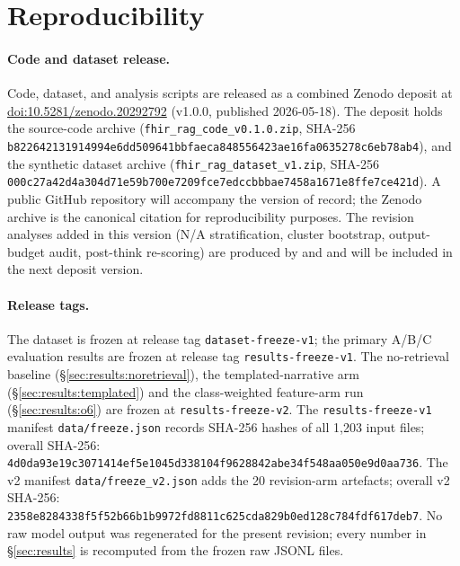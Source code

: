 
\section{Reproducibility}
\label{sec:reproducibility}

\paragraph{Code and dataset release.}
Code, dataset, and analysis scripts are released as a combined Zenodo deposit at
\href{https://doi.org/10.5281/zenodo.20292792}{doi:10.5281/zenodo.20292792}
(v1.0.0, published 2026-05-18).  The deposit
holds the source-code archive
(\texttt{fhir\_rag\_code\_v0.1.0.zip}, SHA-256
\texttt{b822642131914994e6dd509641bbfaeca}\linebreak[1]\texttt{848556423ae16fa0635278c6eb78ab4}),
and the synthetic dataset archive (\texttt{fhir\_rag\_dataset\_v1.zip}, SHA-256
\texttt{000c27a42d4a304d71e59b700e7209fce}\linebreak[1]\texttt{7edccbbbae7458a1671e8ffe7ce421d}).
A public GitHub repository will accompany the version of record; the
Zenodo archive is the canonical citation for reproducibility purposes.  The revision
analyses added in this version (N/A stratification, cluster bootstrap, output-budget
audit, post-think re-scoring) are produced by
 and 
and will be included in the next deposit version.

\paragraph{Release tags.}
The dataset is frozen at release tag \texttt{dataset-freeze-v1}; the primary A/B/C
evaluation results are frozen at release tag \texttt{results-freeze-v1}.  The no-retrieval
baseline (\S\ref{sec:results:noretrieval}), the templated-narrative arm
(\S\ref{sec:results:templated}) and the class-weighted feature-arm run
(\S\ref{sec:results:o6}) are frozen at \texttt{results-freeze-v2}.  The
\texttt{results-freeze-v1} manifest \texttt{data/freeze.json} records SHA-256 hashes of
all 1{,}203 input files; overall SHA-256:\\
\texttt{4d0da93e19c3071414ef5e1045d338104f}\linebreak[1]\texttt{9628842abe34f548aa050e9d0aa736}.
The v2 manifest \texttt{data/freeze\_v2.json} adds the 20 revision-arm
artefacts; overall v2 SHA-256:\\
\texttt{2358e8284338f5f52b66b1b9972fd8811}\linebreak[1]\texttt{c625cda829b0ed128c784fdf617deb7}.
No raw model output was regenerated for the present revision; every number in
\S\ref{sec:results} is recomputed from the frozen raw JSONL files.

